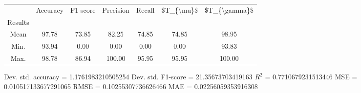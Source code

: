 \begin{tabular}{|c|c|c|c|c|c|c|}
\toprule
{} &  Accuracy &  F1 score &  Precision &  Recall &  \$T\_\{\textbackslash mu\}\$ &  \$T\_\{\textbackslash gamma\}\$ \\
Results &           &           &            &         &            &               \\
\hline
Mean    &     97.78 &     73.85 &      82.25 &   74.85 &      74.85 &         98.95 \\
Min.    &     93.94 &      0.00 &       0.00 &    0.00 &       0.00 &         93.83 \\
Max.    &     98.78 &     86.94 &     100.00 &   95.95 &      95.95 &        100.00 \\
\bottomrule
\end{tabular}

 Dev. std. accuracy = 1.1761983210505254
 Dev. std. F1-score = 21.35673703419163
 $R^2$ = 0.7710679231513446
 MSE = 0.010517133677291065
 RMSE = 0.10255307736626466
 MAE = 0.02256059353916308